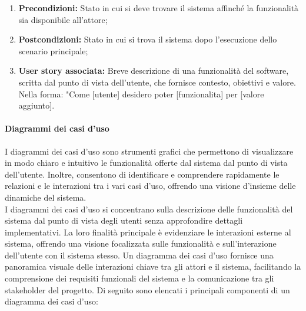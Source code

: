 \documentclass{article}
\begin{document}
\begin{enumerate}
    \item \textbf{Precondizioni:} Stato in cui si deve trovare il sistema affinché la funzionalità sia disponibile all'attore;
    \item \textbf{Postcondizioni:} Stato in cui si trova il sistema dopo l'esecuzione dello scenario principale;
    \item \textbf{User story associata:} Breve descrizione di una funzionalità del software, scritta dal punto di vista dell'utente, che fornisce contesto, obiettivi e valore. \\
    Nella forma: "Come [utente] desidero poter [funzionalita] per [valore aggiunto].
\end{enumerate}

\paragraph{Diagrammi dei casi d'uso} 
I diagrammi dei casi d'uso sono strumenti grafici che permettono di visualizzare in modo chiaro e intuitivo le funzionalità offerte dal sistema dal punto di vista dell'utente. Inoltre, consentono di identificare e comprendere rapidamente le relazioni e le interazioni tra i vari casi d'uso, offrendo una visione d'insieme delle dinamiche del sistema.\\
I diagrammi dei casi d'uso si concentrano sulla descrizione delle funzionalità del sistema dal punto di vista degli utenti senza approfondire dettagli implementativi. La loro finalità principale è evidenziare le interazioni esterne al sistema, offrendo una visione focalizzata sulle funzionalità e sull'interazione dell'utente con il sistema stesso.
Un diagramma dei casi d'uso fornisce una panoramica visuale delle interazioni chiave tra gli attori e il sistema, facilitando la comprensione dei requisiti funzionali del sistema e la comunicazione tra gli stakeholder del progetto.
Di seguito sono elencati i principali componenti di un diagramma dei casi d'uso:
\end{document}

